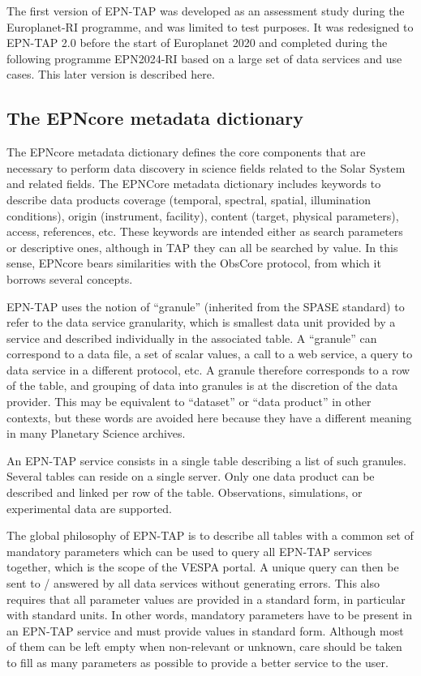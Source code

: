 \documentclass[11pt,a4paper]{ivoa}
\begin{document}
The first version of EPN-TAP was developed as an assessment study
during the Europlanet-RI programme, and was limited to test purposes. It
was redesigned to EPN-TAP 2.0 before the start of Europlanet 2020 and
completed during the following programme EPN2024-RI based on a large
set of data services and use cases. This later version is described here.


\subsection{The EPNcore metadata dictionary}

The EPNcore metadata dictionary defines the core components that are
necessary to perform data discovery in science fields related to the
Solar System and related fields. The EPNCore metadata dictionary includes
keywords to describe data products coverage (temporal, spectral, spatial,
illumination conditions), origin (instrument, facility), content (target,
physical parameters), access, references, etc. These keywords are intended
either as search parameters or descriptive ones, although in TAP they
can all be searched by value. In this sense, EPNcore bears similarities
with the ObsCore protocol, from which it borrows several concepts.

EPN-TAP uses the notion of ``granule'' (inherited from the SPASE standard)
to refer to the data service granularity, which is smallest data unit
provided by a service and described individually in the associated
table. A ``granule'' can correspond to a data file, a set of scalar
values, a call to a web service, a query to data service in a different
protocol, etc. A granule therefore corresponds to a row of the table,
and grouping of data into granules is at the discretion of the data
provider. This may be equivalent to ``dataset'' or ``data product''
in other contexts, but these words are avoided here because they have
a different meaning in many Planetary Science archives.

An EPN-TAP service consists in a single table describing a list of such
granules. Several tables can reside on a single server. Only one data
product can be described and linked per row of the table. Observations,
simulations, or experimental data are supported.

The global philosophy of EPN-TAP is to describe all tables with a common
set of mandatory parameters which can be used to query all EPN-TAP
services together, which is the scope of the VESPA portal. A unique query
can then be sent to / answered by all data services without generating
errors. This also requires that all parameter values are provided in
a standard form, in particular with standard units. In other words,
mandatory parameters have to be present in an EPN-TAP service and must
provide values in standard form. Although most of them can be left
empty when non-relevant or unknown, care should be taken to fill as many
parameters as possible to provide a better service to the user.
\end{document}
